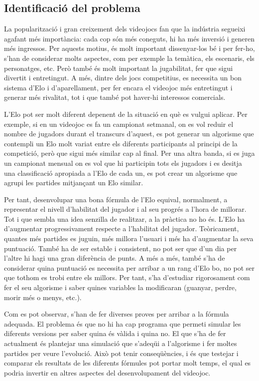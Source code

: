 \documentclass[a4paper]{article}
\begin{document}
\subsection{Identificació del problema}
La popularització i gran creixement dels videojocs fan que la indústria segueixi agafant més importància: cada cop són més coneguts, hi ha més inversió i generen més ingressos. Per aquests motius, és molt important dissenyar-los bé i per fer-ho, s'han de considerar molts aspectes, com per exemple la temàtica, els escenaris, els personatges, etc. Però també és molt important la jugabilitat, fer que sigui divertit i entretingut. A més, dintre dels jocs competitius, es necessita un bon sistema d'Elo i d'aparellament, per fer encara el videojoc més entretingut i generar més rivalitat, tot i que també pot haver-hi interessos comercials.

L'Elo pot ser molt diferent depenent de la situació en què es vulgui aplicar. Per exemple, si en un videojoc es fa un campionat setmanal, on es vol reduir el nombre de jugadors durant el transcurs d'aquest, es pot generar un algorisme que contempli un Elo molt variat entre els diferents participants al principi de la competició, però que sigui més similar cap al final. Per una altra banda, si es juga un campionat mensual on es vol que hi participin tots els jugadors i es desitja una classificació apropiada a l'Elo de cada un, es pot crear un algorisme que agrupi les partides mitjançant un Elo similar.

Per tant, desenvolupar una bona fórmula de l'Elo equival, normalment, a representar el nivell d'habilitat del jugador i al seu progrés a l'hora de millorar. Tot i que sembla una idea senzilla de realitzar, a la pràctica no ho és. L'Elo ha d'augmentar progressivament respecte a l'habilitat del jugador. Teòricament, quantes més partides es juguin, més millora l'usuari i més ha d'augmentar la seva puntuació. També ha de ser estable i consistent, no pot ser que d'un dia per l'altre hi hagi una gran diferència de punts. A més a més, també s'ha de considerar quina puntuació es necessita per arribar a un rang d'Elo bo, no pot ser que tothom es trobi entre els millors. Per tant, s'ha d'estudiar rigorosament com fer el seu algorisme i saber quines variables la modificaran (guanyar, perdre, morir més o menys, etc.).

Com es pot observar, s'han de fer diverses proves per arribar a la fórmula adequada. El problema és que no hi ha cap programa que permeti simular les diferents versions per saber quina és vàlida i quina no. El que s'ha de fer actualment és plantejar una simulació que s'adeqüi a l'algorisme i fer moltes partides per veure l'evolució. Això pot tenir conseqüències, i és que testejar i comparar els resultats de les diferents fórmules pot portar molt temps, el qual es podria invertir en altres aspectes del desenvolupament del videojoc. 
\end{document}
